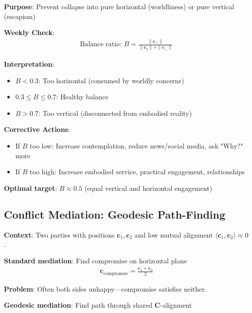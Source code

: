 \documentclass[11pt,a4paper]{article}
\theoremstyle{definition}
\theoremstyle{remark}
\newcommand{\cc}{\mathbf{c}}
\begin{document}
\begin{small}
\begin{enumerate}
\begin{protocol}
\textbf{Purpose}: Prevent collapse into pure horizontal (worldliness) or pure vertical (escapism)

\textbf{Weekly Check}:
\begin{align}
\text{Balance ratio: } B = \frac{\|\cc_\perp\|}{\|\cc_\parallel\| + \|\cc_\perp\|}
\end{align}

\textbf{Interpretation}:
\begin{itemize}
    \item \(B < 0.3\): Too horizontal (consumed by worldly concerns)
    \item \(0.3 \leq B \leq 0.7\): Healthy balance
    \item \(B > 0.7\): Too vertical (disconnected from embodied reality)
\end{itemize}

\textbf{Corrective Actions}:
\begin{itemize}
    \item If \(B\) too low: Increase contemplation, reduce news/social media, ask "Why?" more
    \item If \(B\) too high: Increase embodied service, practical engagement, relationships
\end{itemize}

\textbf{Optimal target}: \(B \approx 0.5\) (equal vertical and horizontal engagement)
\end{protocol}

\subsection{Conflict Mediation: Geodesic Path-Finding}

\begin{protocol}
\textbf{Context}: Two parties with positions \(\cc_1, \cc_2\) and low mutual alignment \(\langle \cc_1, \cc_2 \rangle \approx 0\).

\textbf{Standard mediation}: Find compromise on horizontal plane
\begin{align}
\cc_{\text{compromise}} = \frac{\cc_1 + \cc_2}{2}
\end{align}

\textbf{Problem}: Often both sides unhappy—compromise satisfies neither.

\textbf{Geodesic mediation}: Find path through shared \(\mathbf{C}\)-alignment


\end{protocol}
\end{enumerate}
\end{small}
\end{document}
